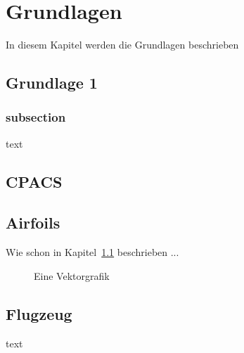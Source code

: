 \chapter{Grundlagen}\label{chp:Grundlageb}
In diesem Kapitel werden die Grundlagen beschrieben

\section{Grundlage 1}\label{sec:Grundlage1}
\subsection{subsection}
text

\section{CPACS}

\section{Airfoils}
Wie schon in Kapitel~\ref{sec:Grundlage1} beschrieben ...

\begin{figure}[htpb]
	\centering
		
	\caption{Eine Vektorgrafik}
	\label{fig:vectorExample}
\end{figure}


\section{Flugzeug}
text